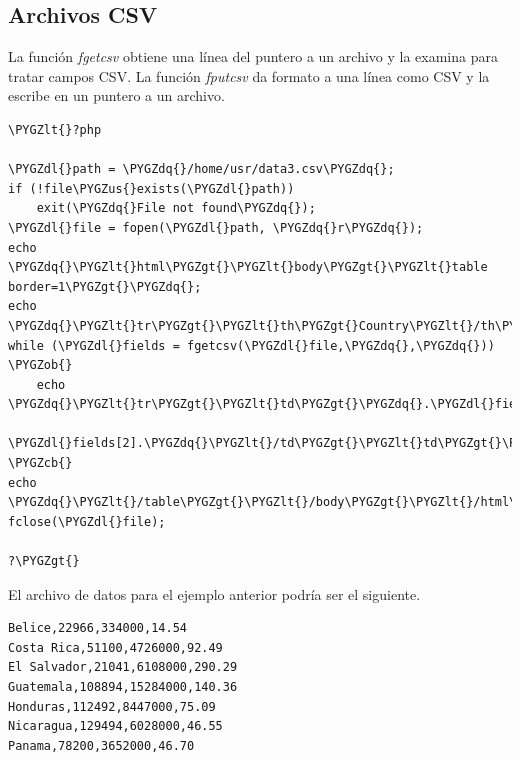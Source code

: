 \documentclass[a5paper,10pt,spanish]{sphinxmanual}
\def\PYGZus{\char`\_}
\def\PYGZob{\char`\{}
\def\PYGZcb{\char`\}}
\def\PYGZlt{\char`\<}
\def\PYGZgt{\char`\>}
\def\PYGZdl{\char`\$}
\def\PYGZdq{\char`\"}
\begin{document}
\subsection{Archivos CSV}
\label{Tutorial4_Archivos.md:archivos-csv}
La función \emph{fgetcsv} obtiene una línea del puntero a un archivo y la
examina para tratar campos CSV. La función \emph{fputcsv} da formato a una
línea como CSV y la escribe en un puntero a un archivo.

\begin{Verbatim}[commandchars=\\\{\}]
\PYGZlt{}?php

\PYGZdl{}path = \PYGZdq{}/home/usr/data3.csv\PYGZdq{};
if (!file\PYGZus{}exists(\PYGZdl{}path))
    exit(\PYGZdq{}File not found\PYGZdq{});
\PYGZdl{}file = fopen(\PYGZdl{}path, \PYGZdq{}r\PYGZdq{});
echo \PYGZdq{}\PYGZlt{}html\PYGZgt{}\PYGZlt{}body\PYGZgt{}\PYGZlt{}table border=1\PYGZgt{}\PYGZdq{};
echo \PYGZdq{}\PYGZlt{}tr\PYGZgt{}\PYGZlt{}th\PYGZgt{}Country\PYGZlt{}/th\PYGZgt{}\PYGZlt{}th\PYGZgt{}Area\PYGZlt{}/th\PYGZgt{}\PYGZlt{}th\PYGZgt{}Population\PYGZlt{}/th\PYGZgt{}\PYGZlt{}th\PYGZgt{}Density\PYGZlt{}/th\PYGZgt{}\PYGZlt{}/tr\PYGZgt{}\PYGZdq{};
while (\PYGZdl{}fields = fgetcsv(\PYGZdl{}file,\PYGZdq{},\PYGZdq{})) \PYGZob{}
    echo \PYGZdq{}\PYGZlt{}tr\PYGZgt{}\PYGZlt{}td\PYGZgt{}\PYGZdq{}.\PYGZdl{}fields[0].\PYGZdq{}\PYGZlt{}/td\PYGZgt{}\PYGZlt{}td\PYGZgt{}\PYGZdq{}.\PYGZdl{}fields[1].\PYGZdq{}\PYGZlt{}/td\PYGZgt{}\PYGZlt{}td\PYGZgt{}\PYGZdq{}.
         \PYGZdl{}fields[2].\PYGZdq{}\PYGZlt{}/td\PYGZgt{}\PYGZlt{}td\PYGZgt{}\PYGZdq{}.\PYGZdl{}fields[3].\PYGZdq{}\PYGZlt{}/td\PYGZgt{}\PYGZlt{}/tr\PYGZgt{}\PYGZdq{};
\PYGZcb{}
echo \PYGZdq{}\PYGZlt{}/table\PYGZgt{}\PYGZlt{}/body\PYGZgt{}\PYGZlt{}/html\PYGZgt{}\PYGZdq{};
fclose(\PYGZdl{}file);

?\PYGZgt{}
\end{Verbatim}

El archivo de datos para el ejemplo anterior podría ser el siguiente.

\begin{Verbatim}[commandchars=\\\{\}]
Belice,22966,334000,14.54
Costa Rica,51100,4726000,92.49
El Salvador,21041,6108000,290.29
Guatemala,108894,15284000,140.36
Honduras,112492,8447000,75.09
Nicaragua,129494,6028000,46.55
Panama,78200,3652000,46.70
\end{Verbatim}
\end{document}
